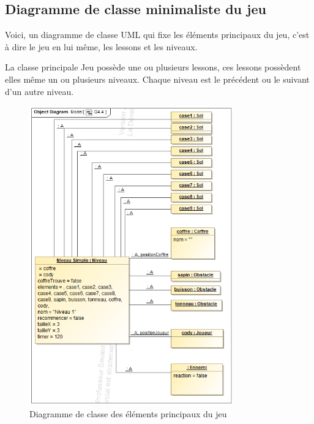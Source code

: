 
\subsection{Diagramme de classe minimaliste du jeu}
\label{sec:question-1}

Voici, un diagramme de classe UML qui fixe les éléments principaux du jeu, c'est à dire le jeu en lui même, les lessons et les niveaux.

La classe principale Jeu possède une ou plusieurs lessons, ces lessons possèdent elles même un ou plusieurs niveaux.
Chaque niveau est le précédent ou le suivant d'un autre niveau.

\begin{figure}[h!]
	\centering
	\includegraphics[width=250pt]{assets/Jeu_minimalist}
	\caption{Diagramme de classe des éléments principaux du jeu}
	\label{fig:diagrammeclassebase}
\end{figure}

\newpage